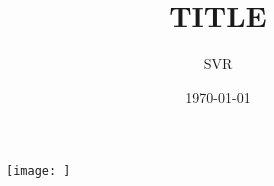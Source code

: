 \documentclass[9pt]{extarticle}
\title{TITLE}
\author{SVR}
\date{\today}
\begin{document}
\maketitle



\lipsum





\newpage
\begin{figure}
    \centering
    \texttt{[image: ]}
\end{figure}


\newpage
\begin{paracol}{2}
    \lipsum
    \switchcolumn
    \lipsum
\end{paracol}




\end{document}
